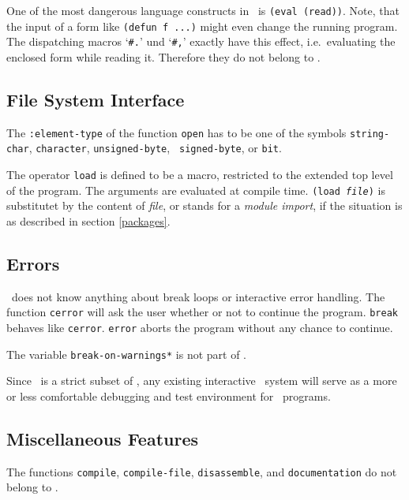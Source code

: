 One of the most dangerous language constructs in \CL\ is {\tt (eval 
(read))}. Note, that the input of a form like {\tt (defun f ...)} might 
even change the running program. The dispatching macros `{\tt \#.}' und 
`{\tt \#,}' exactly have this effect, i.e.\ evaluating the enclosed form 
while reading it. Therefore they do not belong to .

\subsection{File System Interface}
\label{file}

The {\tt :element-type} of the function {\tt open} has to be one of the 
symbols {\tt string-char}, {\tt character}, {\tt unsigned-byte}, {\tt 
signed-byte}, or {\tt bit}.

The operator {\tt load} is defined to be a macro, restricted to the 
extended top level of the program. The arguments are evaluated at compile 
time. {\tt (load {\it file}\/)} is substitutet by the content of {\it
  file}, or stands for a {\em module import},
if the situation is as
described in section \ref{packages}.

\subsection{Errors}

\ does not know anything about break loops or interactive error 
handling. The function {\tt cerror} will ask the user whether or not to 
continue the program. {\tt break} behaves like {\tt cerror}. {\tt error} 
aborts the program without any chance to continue.

The variable {\tt *break-on-warnings*} is not part of .

Since \ is a strict subset of \CL, any existing interactive \CL\ system 
will serve as a more or less comfortable debugging and test environment for 
\ programs. 

\subsection{Miscellaneous Features}

The functions {\tt compile}, {\tt compile-file}, {\tt disassemble},
and {\tt documentation} do not belong to .

